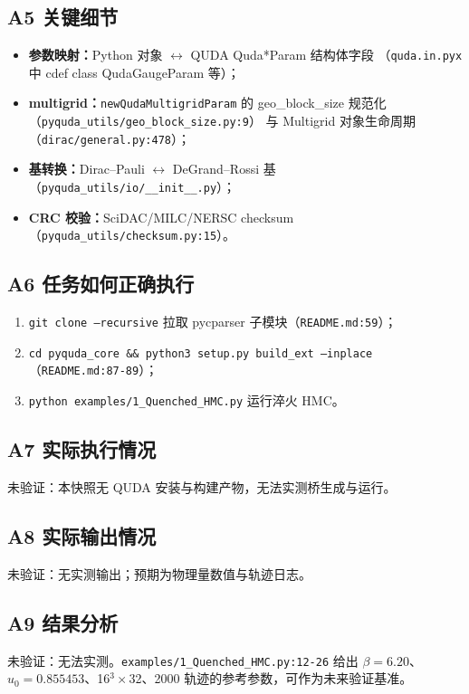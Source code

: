 \documentclass[UTF8]{ctexart}
\begin{document}
\subsection{A5 关键细节}
\begin{itemize}
  \item \textbf{参数映射：}Python 对象 $\leftrightarrow$ QUDA Quda*Param 结构体字段
        （\texttt{quda.in.pyx} 中 cdef class QudaGaugeParam 等）；
  \item \textbf{multigrid：}\texttt{\nolinkurl{newQudaMultigridParam}} 的
        geo\_block\_size 规范化（\texttt{\nolinkurl{pyquda_utils/geo_block_size.py:9}}）
        与 Multigrid 对象生命周期（\texttt{\nolinkurl{dirac/general.py:478}}）；
  \item \textbf{基转换：}Dirac--Pauli $\leftrightarrow$ DeGrand--Rossi 基
        （\texttt{pyquda\_utils/io/\_\_init\_\_.py}）；
  \item \textbf{CRC 校验：}SciDAC/MILC/NERSC checksum（\texttt{pyquda\_utils/checksum.py:15}）。
\end{itemize}

\subsection{A6 任务如何正确执行}
\begin{enumerate}
  \item \texttt{git clone --recursive} 拉取 pycparser 子模块（\texttt{README.md:59}）；
  \item \texttt{cd pyquda\_core \&\& python3 setup.py build\_ext --inplace}（\texttt{README.md:87-89}）；
  \item \texttt{python examples/1\_Quenched\_HMC.py} 运行淬火 HMC。
\end{enumerate}

\subsection{A7 实际执行情况}
\textcolor{warn}{未验证}：本快照无 QUDA 安装与构建产物，无法实测桥生成与运行。

\subsection{A8 实际输出情况}
\textcolor{warn}{未验证}：无实测输出；预期为物理量数值与轨迹日志。

\subsection{A9 结果分析}
\textcolor{warn}{未验证}：无法实测。\texttt{examples/1\_Quenched\_HMC.py:12-26} 给出
$\beta=6.20$、$u_0=0.855453$、16$^3\times$32、2000 轨迹的参考参数，可作为未来验证基准。
\end{document}
